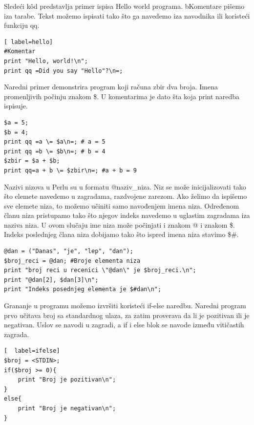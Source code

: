 \documentclass[a4paper]{article}
\begin{document}
Sledeći k\^{o}d predstavlja primer ispisa Hello world programa. bKomentare pišemo iza tarabe. Tekst možemo ispisati tako što ga navedemo iza navodnika ili koristeći funkciju qq.
\begin{lstlisting}[ label=hello]
#Komentar
print "Hello, world!\n";
print qq =Did you say "Hello"?\n=;
\end{lstlisting}

Naredni primer demonstrira program koji računa zbir dva broja. Imena promenljivih počinju znakom \$. U komentarima je dato šta koja print naredba ispisuje.
\begin{lstlisting}[label = zbir]
$a = 5;
$b = 4;
print qq =a \= $a\n=; # a = 5
print qq =b \= $b\n=; # b = 4
$zbir = $a + $b;
print qq=a + b \= $zbir\n=; #a + b = 9
\end{lstlisting}
Nazivi nizova u Perlu su u formatu @naziv\_niza. Niz se može inicijalizovati tako što elemete navedemo u zagradama, razdvojene zarezom. Ako želimo da ispišemo sve elemete niza, to možemo učiniti samo navođenjem imena niza. Određenom članu niza pristupamo tako što njegov indeks navedemo u uglastim zagradama iza naziva niza. U ovom slučaju ime niza može počinjati i znakom @ i znakom \$. Indeks poslednjeg člana niza dobijamo tako što ispred imena niza stavimo \$\#.
\begin{lstlisting}[label=niz]
@dan = ("Danas", "je", "lep", "dan"); 
$broj_reci = @dan; #Broje elementa niza
print "broj reci u recenici \"@dan\" je $broj_reci.\n";
print "@dan[2], $dan[3]\n";
print "Indeks posednjeg elementa je $#dan\n";
\end{lstlisting}
Grananje u programu možemo izvršiti koristeći if-else naredbu. Naredni program prvo učitava broj sa standardnog ulaza, za zatim proverava da li je pozitivan ili je negativan. Uslov se navodi u zagradi, a if i else blok se navode između vitičastih zagrada.
\begin{lstlisting}[  label=ifelse]
$broj = <STDIN>;
if($broj >= 0){
    print "Broj je pozitivan\n";
}
else{
    print "Broj je negativan\n";
}
\end{lstlisting}
\end{document}
